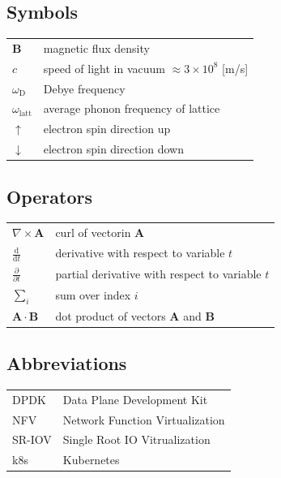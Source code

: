 \documentclass[english, 12pt, a4paper, elec, utf8, a-1b, online]{aaltothesis}
\begin{document}
\newpage


\thesistableofcontents



\subsection*{Symbols}

\begin{tabular}{ll}

$\mathbf{B}$  & magnetic flux density  \\
$c$              & speed of light in vacuum $\approx 3\times10^8$ [m/s]\\
$\omega_{\mathrm{D}}$    & Debye frequency \\
$\omega_{\mathrm{latt}}$ & average phonon frequency of lattice \\
$\uparrow$       & electron spin direction up\\
$\downarrow$     & electron spin direction down
\end{tabular}

\subsection*{Operators}

\begin{tabular}{ll}
$\nabla \times \mathbf{A}$              & curl of vectorin $\mathbf{A}$\\
$\displaystyle\frac{\mbox{d}}{\mbox{d} t}$ & derivative with respect to 
variable $t$\\[3mm]
$\displaystyle\frac{\partial}{\partial t}$  & partial derivative with respect 
to variable $t$ \\[3mm]
$\sum_i $                       & sum over index $i$\\
$\mathbf{A} \cdot \mathbf{B}$    & dot product of vectors $\mathbf{A}$ and 
$\mathbf{B}$
\end{tabular}

\subsection*{Abbreviations}

\begin{tabular}{ll}
DPDK        & Data Plane Development Kit \\
NFV         & Network Function Virtualization \\
SR-IOV      & Single Root IO Vitrualization \\
k8s         & Kubernetes \\
\end{tabular}
\end{document}

